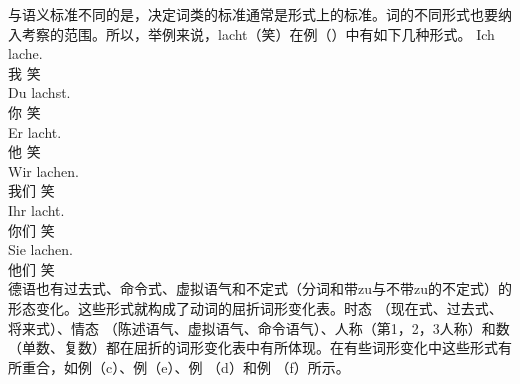 与语义标准不同的是，决定词类的标准通常是形式上的标准。词的不同形式也要纳入考察的范围。所以，举例来说，lacht（笑）在例（）中有如下几种形式。
\eal
\ex 
\gll Ich lache.\\
     我 笑\\
\ex 
\gll Du lachst.\\
     你 笑\\
\ex 
\gll Er lacht.\\
     他 笑\\
\ex 
\gll Wir lachen.\\
     我们 笑\\
\ex 
\gll Ihr lacht.\\
     你们 笑\\
\ex 
\gll Sie lachen.\\
     他们 笑\\
\zl
德语也有过去式、命令式、虚拟语气和不定式（分词和带zu与不带zu的不定式）的形态变化。这些形式就构成了动词的屈折词形变化表。时态 （现在式、过去式、将来式）、情态 （陈述语气、虚拟语气、命令语气）、人称（第1，2，3人称）和数（单数、复数）都在屈折的词形变化表中有所体现。在有些词形变化中这些形式有所重合，如例（c）、例（e）、例 （d）和例 （f）所示。

